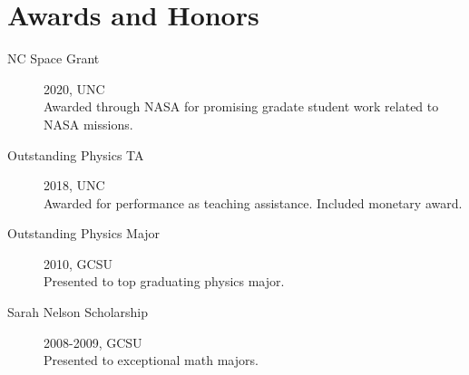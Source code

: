 \documentclass[11pt]{article}
\begin{document}
\section*{Awards and Honors}
\begin{minipage}{\textwidth}
	\begin{description}
		\item[NC Space Grant] 2020, UNC\\
			Awarded through NASA for promising gradate student work related to NASA missions.
		\item[Outstanding Physics TA] 2018, UNC\\
			Awarded for performance as  teaching  assistance.  Included monetary award.
		\item[Outstanding Physics Major] 2010, GCSU\\
			Presented to top graduating physics major.
		\item[Sarah Nelson Scholarship] 2008-2009, GCSU\\
			Presented to exceptional math majors.
	\end{description}
\end{minipage}
\end{document}
